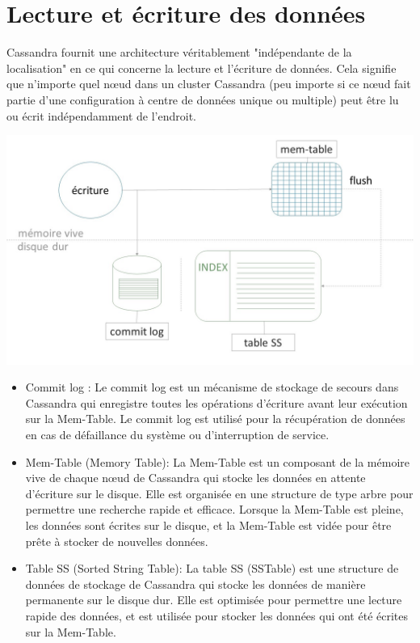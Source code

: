 \documentclass[12pt, letterpaper]{report}
\begin{document}
\section{Lecture et écriture des données}
Cassandra fournit une architecture véritablement "indépendante de la localisation" en ce qui concerne la lecture et l'écriture de données. Cela signifie que n'importe quel nœud dans un cluster Cassandra (peu importe si ce nœud fait partie d'une configuration à centre de données unique ou multiple) peut être lu ou écrit indépendamment de l’endroit.
\begin{center}
	\includegraphics[width=\textwidth]{ecriture}
\end{center}
\begin{itemize}
  \item Commit log : Le commit log est un mécanisme de stockage de secours dans Cassandra qui enregistre toutes les opérations d'écriture avant leur exécution sur la Mem-Table. Le commit log est utilisé pour la récupération de données en cas de défaillance du système ou d'interruption de service.
  \item Mem-Table (Memory Table): La Mem-Table est un composant de la mémoire vive de chaque nœud de Cassandra qui stocke les données en attente d'écriture sur le disque. Elle est organisée en une structure de type arbre pour permettre une recherche rapide et efficace. Lorsque la Mem-Table est pleine, les données sont écrites sur le disque, et la Mem-Table est vidée pour être prête à stocker de nouvelles données.
  \item Table SS (Sorted String Table): La table SS (SSTable) est une structure de données de stockage de Cassandra qui stocke les données de manière permanente sur le disque dur. Elle est optimisée pour permettre une lecture rapide des données, et est utilisée pour stocker les données qui ont été écrites sur la Mem-Table.
\end{itemize}
\end{document}
